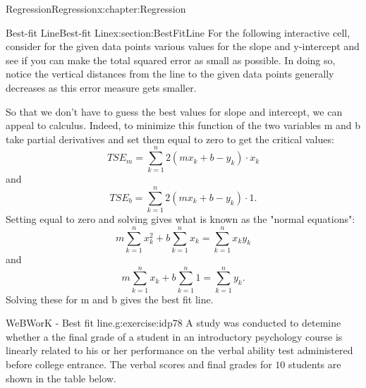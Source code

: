 \documentclass[oneside,10pt,]{book}
\numberwithin{equation}{section}
\begin{document}
\begin{chapterptx}{Regression}{}{Regression}{}{}{x:chapter:Regression}
\begin{sectionptx}{Best-fit Line}{}{Best-fit Line}{}{}{x:section:BestFitLine}
For the following interactive cell, consider for the given data points various values for the slope and y-intercept and see if you can make the total squared error as small as possible. In doing so, notice the vertical distances from the line to the given data points generally decreases as this error measure gets smaller.%
So that we don't have to guess the best values for slope and intercept, we can appeal to calculus. Indeed, to minimize this function of the two variables m and b take partial derivatives and set them equal to zero to get the critical values:%
\begin{equation*}
TSE_m = \sum_{k=1}^n 2(m x_k + b - y_k) \cdot x_k
\end{equation*}
and%
\begin{equation*}
TSE_b = \sum_{k=1}^n 2(m x_k + b - y_k) \cdot 1 .
\end{equation*}
Setting equal to zero and solving gives what is known as the "normal equations":%
\begin{equation*}
m \sum_{k=1}^n x_k^2 + b \sum_{k=1}^n x_k = \sum_{k=1}^n x_k y_k
\end{equation*}
and%
\begin{equation*}
m \sum_{k=1}^n x_k + b \sum_{k=1}^n 1 = \sum_{k=1}^n y_k.
\end{equation*}
Solving these for m and b gives the best fit line.%
\begin{inlineexercise}{WeBWorK - Best fit line.}{g:exercise:idp78}%
A study was conducted to detemine whether a the final grade of a student in an introductory psychology course is linearly related to his or her performance on the verbal ability test administered before college entrance.  The verbal scores and final grades for \(10\) students are shown in the table below.%
\begin{sidebyside}{1}{0}{0}{0}%
\begin{sbspanel}{1}%

\end{sbspanel}
\end{sidebyside}
\end{inlineexercise}
\end{sectionptx}
\end{chapterptx}
\end{document}
